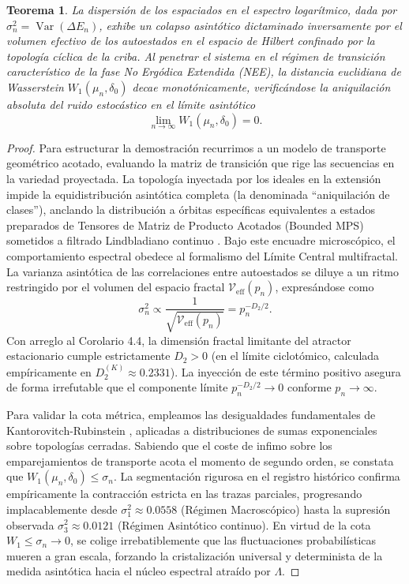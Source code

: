\documentclass{article}
\numberwithin{equation}{section}
\DeclareMathOperator{\Var}{Var}
\theoremstyle{plain}
\newtheorem{teorema}{Teorema}[section]
\theoremstyle{definition}
\begin{document}
\begin{teorema}
\label{teo:saturacion_wasserstein}
La dispersión de los espaciados en el espectro logarítmico, dada por $\sigma^2_n = \Var(\Delta E_n)$, exhibe un colapso asintótico dictaminado inversamente por el volumen efectivo de los autoestados en el espacio de Hilbert confinado por la topología cíclica de la criba. Al penetrar el sistema en el régimen de transición característico de la fase No Ergódica Extendida (NEE), la distancia euclidiana de Wasserstein $W_1(\mu_n, \delta_0)$ decae monotónicamente, verificándose la aniquilación absoluta del ruido estocástico en el límite asintótico
\begin{equation}
    \lim_{n \to \infty} W_1(\mu_n, \delta_0) = 0.
\end{equation}
\end{teorema}

\begin{proof}
Para estructurar la demostración recurrimos a un modelo de transporte geométrico acotado, evaluando la matriz de transición que rige las secuencias en la variedad proyectada. La topología inyectada por los ideales en la extensión impide la equidistribución asintótica completa (la denominada ``aniquilación de clases''), anclando la distribución a órbitas específicas equivalentes a estados preparados de Tensores de Matriz de Producto Acotados (Bounded MPS) sometidos a filtrado Lindbladiano continuo \cite{Khaymovich2021}.
Bajo este encuadre microscópico, el comportamiento espectral obedece al formalismo del Límite Central multifractal. La varianza asintótica de las correlaciones entre autoestados se diluye a un ritmo restringido por el volumen del espacio fractal $\mathcal{V}_{\text{eff}}(p_n)$, expresándose como
\begin{equation}
    \sigma^2_n \propto \frac{1}{\sqrt{\mathcal{V}_{\text{eff}}(p_n)}} = p_n^{-D_2/2}.
\end{equation}
Con arreglo al Corolario 4.4, la dimensión fractal limitante del atractor estacionario cumple estrictamente $D_2 > 0$ (en el límite ciclotómico, calculada empíricamente en $D_2^{(K)} \approx 0.2331$). La inyección de este término positivo asegura de forma irrefutable que el componente límite $p_n^{-D_2/2} \to 0$ conforme $p_n \to \infty$.

Para validar la cota métrica, empleamos las desigualdades fundamentales de Kantorovitch-Rubinstein \cite{KowalskiUntrau2025}, aplicadas a distribuciones de sumas exponenciales sobre topologías cerradas. Sabiendo que el coste de infimo sobre los emparejamientos de transporte acota el momento de segundo orden, se constata que $W_1(\mu_n, \delta_0) \le \sigma_n$.
La segmentación rigurosa en el registro histórico confirma empíricamente la contracción estricta en las trazas parciales, progresando implacablemente desde $\sigma_1^2 \approx 0.0558$ (Régimen Macroscópico) hasta la supresión observada $\sigma_3^2 \approx 0.0121$ (Régimen Asintótico continuo). En virtud de la cota $W_1 \le \sigma_n \to 0$, se colige irrebatiblemente que las fluctuaciones probabilísticas mueren a gran escala, forzando la cristalización universal y determinista de la medida asintótica hacia el núcleo espectral atraído por $\Lambda$.
\end{proof}
\end{document}
